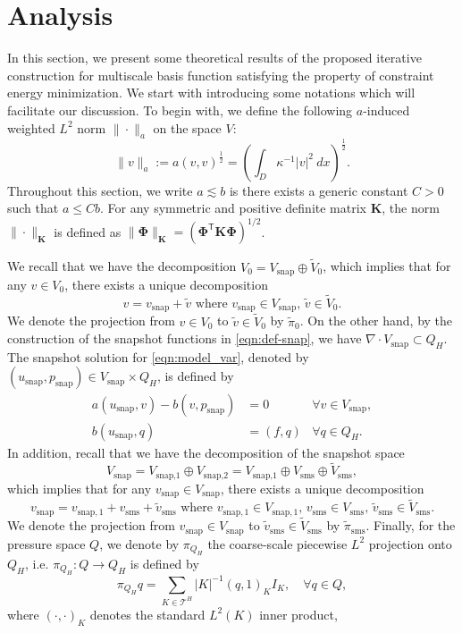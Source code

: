 \documentclass{article}[11pt]
\theoremstyle{definition}
\begin{document}
\section{Analysis}\label{sec:analysis}
In this section, we present some theoretical results of the proposed iterative construction for multiscale basis function satisfying the property of constraint energy minimization. 
We start with introducing some notations which will 
facilitate our discussion. 
To begin with, we define the following $a$-induced weighted $L^2$ norm $\| \cdot \|_a$ on the space $V$: 
\[
\| v \|_a := a(v,v)^{\frac{1}{2}} = \left(\int_D \kappa^{-1} \vert v \vert^2 ~ dx \right)^\frac{1}{2}. 
\]
Throughout this section, we write $a \lesssim b$ is there exists a generic constant $C>0$ such that $a \leq Cb$. 
For any symmetric and positive definite matrix $\mathbf{K}$, 
the norm  $\| \cdot \|_\mathbf{K}$ is defined as 
$\| \mathbf{\Phi} \|_\mathbf{K} = \left(\mathbf{\Phi}^\mathsf{T} \mathbf{K} \mathbf{\Phi}\right)^{1/2}$.

We recall that we have the decomposition $V_0 = V_\text{snap} \oplus \tilde{V}_0$, 
which implies that for any $v \in V_0$, there exists a unique decomposition 
\[
v = v_\text{snap}+ \tilde{v} \text{ where }
v_{\text{snap}} \in V_{\text{snap}}, \,
\tilde{v} \in \tilde{V}_0.
\]
We denote the projection from $v \in V_0$ 
to $\tilde{v} \in \tilde{V}_0$ by $\tilde{\pi}_0$. 
On the other hand, by the construction of the snapshot functions in \eqref{eqn:def-snap}, we have 
$\nabla \cdot V_{\text{snap}} \subset Q_H$. 
The snapshot solution for \eqref{eqn:model_var}, 
denoted by $(u_{\text{snap}}, p_{\text{snap}}) \in V_{\text{snap}} \times Q_H$, 
is defined by
\begin{equation}
\begin{aligned}
a(u_{\text{snap}},v)-b(v,p_{\text{snap}}) & =0 & \forall v\in V_{\text{snap}},\\
b(u_{\text{snap}},q) & =(f,q) & \forall q\in Q_{H}.
\end{aligned}
\label{eqn:snapshot_solution}
\end{equation}
In addition, recall that we have the decomposition of the snapshot space 
\[
V_{\text{snap}} = V_{\text{snap,1}} \oplus V_{\text{snap,2}} = V_{\text{snap,1}} \oplus V_{\text{sms}} \oplus \tilde V_{\text{sms}},
\] 
which implies that for any $v_\text{snap} \in V_{\text{snap}}$, there exists a unique decomposition 
\[
v_{\text{snap}} = v_{\text{snap},1}+v_\text{sms}+\tilde{v}_\text{sms} \text{ where }
v_{\text{snap},1} \in V_{\text{snap},1}, \,
v_\text{sms} \in V_\text{sms}, \,
\tilde{v}_\text{sms} \in \tilde{V}_\text{sms}.
\]
We denote the projection from $v_{\text{snap}} \in V_{\text{snap}}$ 
to $\tilde{v}_\text{sms} \in \tilde{V}_\text{sms}$ by $\tilde{\pi}_{\text{sms}}$. 
Finally, for the pressure space $Q$, we denote by $\pi_{Q_H}$ the coarse-scale 
piecewise $L^2$ projection onto $Q_H$, i.e. $\pi_{Q_H}: Q \to Q_H$ is defined by 
\[
\pi_{Q_H} q = \sum_{K \in \mathcal{T}^H} \vert K \vert^{-1} (q, 1)_K I_K,\quad \forall q \in Q, 
\]
where $(\cdot, \cdot)_K$ denotes the standard $L^2(K)$ inner product, 
\end{document}
